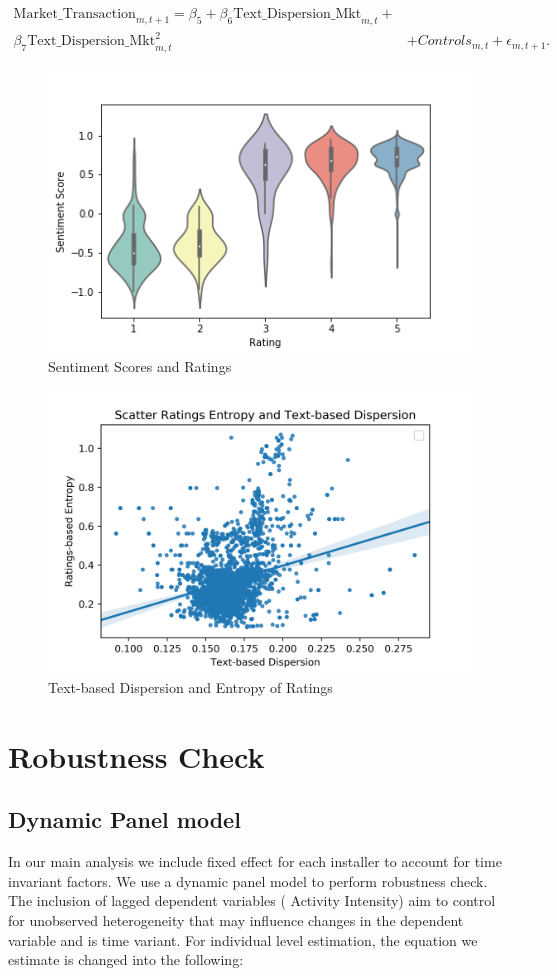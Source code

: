 \documentclass[msom,blindrev]{informs3}
\begin{document}
\begin{align}
   \text{Market\_Transaction}_{m,t+1}  =\beta_{5} + \beta_{6}\text{Text\_Dispersion\_Mkt}_{m,t}+ \\ \nonumber \beta_{7} \text{Text\_Dispersion\_Mkt}_{m,t} ^2 \label{reg: market-level-textbased}
   &+ Controls_{m,t}  +\epsilon_{m,t+1}.
\end{align}
\begin{figure}
	\centering
	\includegraphics[width=0.7\linewidth]{sentscore_violin.png}
	\caption{Sentiment Scores and Ratings}
	\label{fig: sentscore_violinr}
\end{figure}
\begin{figure}
	\centering
	\includegraphics[width=0.7\linewidth]{regplot_text_d_ent_others.png}
	\caption{Text-based Dispersion and Entropy of Ratings}
	\label{fig: regplot_text_d_ent_others}
\end{figure}
\section{Robustness Check}

\subsection{Dynamic Panel model}
In our main analysis we include fixed effect for each installer to account for time invariant factors. We use a dynamic panel model to perform robustness check. The inclusion of lagged dependent variables ( Activity Intensity) aim to control for unobserved heterogeneity that may influence changes in the dependent variable and is time variant. For individual level estimation, the equation we estimate is changed into the following:
\end{document}
